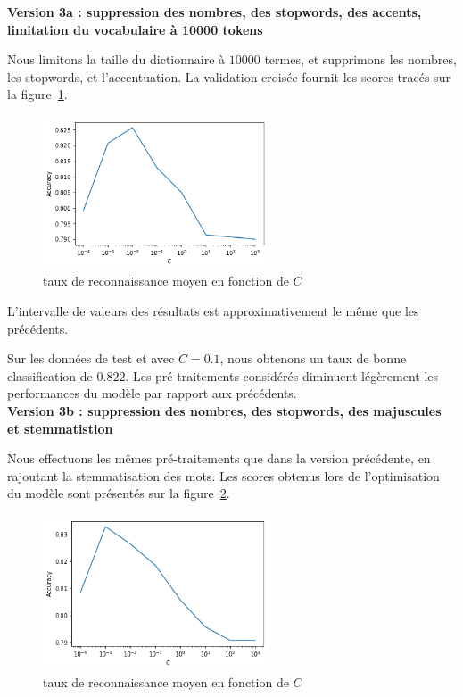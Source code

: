 \documentclass[a4paper]{article}
\newcommand{\figref}[1]{figure~\ref{#1}}
\begin{document}
\textbf{Version 3a : suppression des nombres, des stopwords, des accents,
limitation du vocabulaire à 10000 tokens}

Nous limitons la taille du dictionnaire à $10000$ termes, et supprimons les
nombres, les stopwords, et l'accentuation. La validation croisée fournit les
scores tracés sur la \figref{img:tme2-task2-v2a}.

\begin{figure}[H]
	\center 
	\includegraphics[width=0.6\textwidth]{images/tme2/task2_v2a.png}
    \caption{taux de reconnaissance moyen en fonction de $C$}
    \label{img:tme2-task2-v2a}
\end{figure}

L'intervalle de valeurs des résultats est approximativement le même que les
précédents. 

Sur les données de test et avec $C=0.1$, nous obtenons un taux de bonne
classification de $0.822$. Les pré-traitements considérés diminuent légèrement
les performances du modèle par rapport aux précédents. \\

\textbf{Version 3b : suppression des nombres, des stopwords, des majuscules et
stemmatistion}

Nous effectuons les mêmes pré-traitements que dans la version précédente, en
rajoutant la stemmatisation des mots. Les scores obtenus lors
de l'optimisation du modèle sont présentés sur la \figref{img:tme2-task2-v2b}.

\begin{figure}[H]
	\center 
	\includegraphics[width=0.6\textwidth]{images/tme2/task2_v2b.png}
    \caption{taux de reconnaissance moyen en fonction de $C$}
    \label{img:tme2-task2-v2b}
\end{figure}
\end{document}
